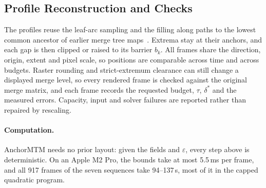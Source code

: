 \documentclass[preprint]{vgtc}   %
\begin{document}
\subsection{Profile Reconstruction and Checks}
The profiles reuse the leaf-arc sampling and the filling along paths to the lowest common ancestor of earlier merge tree maps~\cite{Koepp:2023:TMTM,STMTM:2026}. Extrema stay at their anchors, and each gap is then clipped or raised to its barrier $b_k$. All frames share the direction, origin, extent and pixel scale, so positions are comparable across time and across budgets. Raster rounding and strict-extremum clearance can still change a displayed merge level, so every rendered frame is checked against the original merge matrix, and each frame records the requested budget, $\tau$, $\delta^*$ and the measured errors. Capacity, input and solver failures are reported rather than repaired by rescaling.

\paragraph{Computation.} AnchorMTM needs no prior layout: given the fields and $\varepsilon$, every step above is deterministic. On an Apple M2 Pro, the bounds take at most 5.5\,ms per frame, and all 917 frames of the seven sequences take 94--137\,s, most of it in the capped quadratic program.
\end{document}
